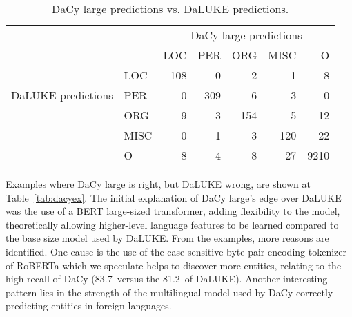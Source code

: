 \documentclass[main.tex]{subfiles}
\begin{document}
\begin{table}[H]
    \centering
    \begin{tabular}{l l | r r r r r }
        & &	\multicolumn{5}{c}{DaCy large predictions}	\\
        \multirow{5}{*}{DaLUKE predictions} & & LOC & PER & ORG & MISC & O \\\hline
           & LOC                             &  108 & 0   & 2   & 1    & 8\\
           & PER                             &  0   & 309 & 6   & 3    & 0\\
           & ORG                             &  9   & 3   & 154 & 5    & 12\\
           & MISC                            &  0   & 1   & 3   & 120  & 22\\
           & O                               &  8   & 4   & 8   & 27   & 9210
    \end{tabular}
    \label{tab:dacycompare}
    \caption{
        DaCy large predictions vs. DaLUKE predictions.
    }
\end{table}\noindent
Examples where DaCy large is right, but DaLUKE wrong, are shown at Table~\ref{tab:dacyex}.
The initial explanation of DaCy large's edge over DaLUKE was the use of a BERT large-sized transformer, adding flexibility to the model, theoretically allowing higher-level language features to be learned compared to the base size model used by DaLUKE.
From the examples, more reasons are identified.
One cause is the use of the case-sensitive byte-pair encoding tokenizer of RoBERTa \cite{conneau2020unsupervised} which we speculate helps to discover more entities, relating to the high recall of DaCy (83.7\pro\ versus the 81.2\pro\ of DaLUKE).
Another interesting pattern lies in the strength of the multilingual model used by DaCy correctly predicting entities in foreign languages.
\end{document}
